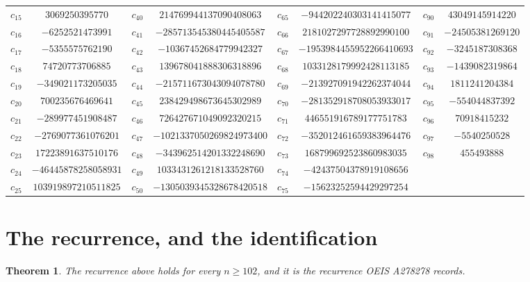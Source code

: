 \documentclass[11pt,a4paper]{article}
\theoremstyle{plain}
\newtheorem{theorem}{Theorem}
\theoremstyle{definition}
\begin{document}
\begin{center}
\begin{tabular}{cccccccc}
$c_{15}$ & $3069250395770$ & $c_{40}$ & $214769944137090408063$ & $c_{65}$ & $-944202240303141415077$ & $c_{90}$ & $43049145914220$ \\
$c_{16}$ & $-6252521473991$ & $c_{41}$ & $-285713545380445405587$ & $c_{66}$ & $2181027297728892990100$ & $c_{91}$ & $-24505381269120$ \\
$c_{17}$ & $-5355575762190$ & $c_{42}$ & $-10367452684779942327$ & $c_{67}$ & $-1953984455952266410693$ & $c_{92}$ & $-3245187308368$ \\
$c_{18}$ & $74720773706885$ & $c_{43}$ & $139678041888306318896$ & $c_{68}$ & $1033128179992428113185$ & $c_{93}$ & $-1439082319864$ \\
$c_{19}$ & $-349021173205035$ & $c_{44}$ & $-215711673043094078780$ & $c_{69}$ & $-213927091942262374044$ & $c_{94}$ & $1811241204384$ \\
$c_{20}$ & $700235676469641$ & $c_{45}$ & $238429498673645302989$ & $c_{70}$ & $-281352918708053933017$ & $c_{95}$ & $-554044837392$ \\
$c_{21}$ & $-289977451908487$ & $c_{46}$ & $726427671049092320215$ & $c_{71}$ & $446551916789177751783$ & $c_{96}$ & $70918415232$ \\
$c_{22}$ & $-2769077361076201$ & $c_{47}$ & $-1021337050269824973400$ & $c_{72}$ & $-352012461659383964476$ & $c_{97}$ & $-5540250528$ \\
$c_{23}$ & $17223891637510176$ & $c_{48}$ & $-343962514201332248690$ & $c_{73}$ & $168799692523860983035$ & $c_{98}$ & $455493888$ \\
$c_{24}$ & $-46445878258058931$ & $c_{49}$ & $1033431261218133528760$ & $c_{74}$ & $-42437504378919108656$ &  &  \\
$c_{25}$ & $103919897210511825$ & $c_{50}$ & $-1305039345328678420518$ & $c_{75}$ & $-15623252594429297254$ &  &  \\
\end{tabular}
\end{center}

\section{The recurrence, and the identification}

\begin{theorem}
The recurrence above holds for every $n\ge102$, and it is the recurrence OEIS A278278 records.
\end{theorem}
\end{document}

